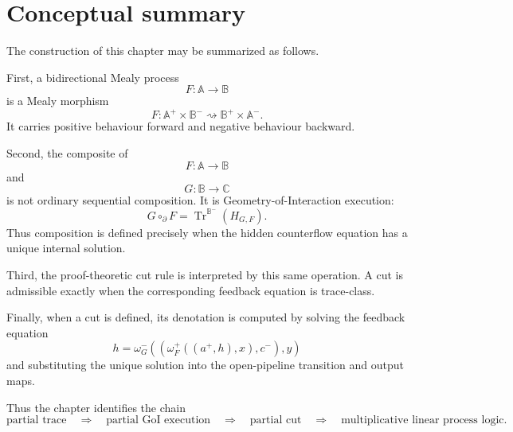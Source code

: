 \section{Conceptual summary}
\label{sec:goi-conceptual-summary}

The construction of this chapter may be summarized as follows.

First, a bidirectional Mealy process
\[
F:\mathbb A\to\mathbb B
\]
is a Mealy morphism
\[
F:
\mathbb A^+\times\mathbb B^-
\rightsquigarrow
\mathbb B^+\times\mathbb A^-.
\]
It carries positive behaviour forward and negative behaviour backward.

Second, the composite of
\[
F:\mathbb A\to\mathbb B
\]
and
\[
G:\mathbb B\to\mathbb C
\]
is not ordinary sequential composition.  It is Geometry-of-Interaction
execution:
\[
G\circ_{\partial}F
=
\operatorname{Tr}^{\mathbb B^-}(H_{G,F}).
\]
Thus composition is defined precisely when the hidden counterflow equation has
a unique internal solution.

Third, the proof-theoretic cut rule is interpreted by this same operation.  A
cut is admissible exactly when the corresponding feedback equation is
trace-class.

Finally, when a cut is defined, its denotation is computed by solving the
feedback equation
\[
h
=
\omega_G^-
\left(
\left(
\omega_F^+((a^+,h),x),
c^-
\right),
y
\right)
\]
and substituting the unique solution into the open-pipeline transition and
output maps.

Thus the chapter identifies the chain
\[
\boxed{
\text{partial trace}
\quad\Longrightarrow\quad
\text{partial GoI execution}
\quad\Longrightarrow\quad
\text{partial cut}
\quad\Longrightarrow\quad
\text{multiplicative linear process logic}.
}
\]